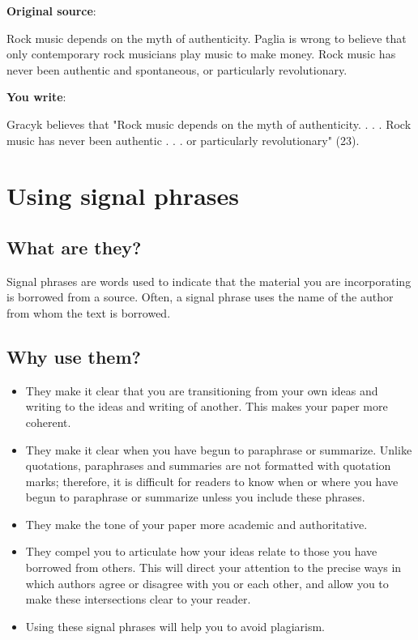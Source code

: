 \textbf{Original source}:

Rock music depends on the myth of authenticity. Paglia is wrong to believe that only contemporary rock musicians play music to make money. Rock music has never been authentic and spontaneous, or particularly revolutionary.

\textbf{You write}:

Gracyk believes that "Rock music depends on the myth of authenticity. . . . Rock music has never been authentic . . . or particularly revolutionary" (23).


 

\section{Using signal phrases}
 
 
\subsection{What are they?}
 
Signal phrases are words used to indicate that the material you are incorporating 
is borrowed from a source. Often, a signal phrase uses the name of the author from 
whom the text is borrowed.
 
\subsection {Why use them?}
 \begin{itemize}

\item They make it clear that you are transitioning from your own ideas and 
writing to the ideas and writing of another. This makes your paper more coherent.
 
\item They make it clear when you have begun to paraphrase or summarize.
Unlike quotations, paraphrases and summaries are not formatted with quotation 
marks; therefore, it is difficult for readers to know when or where you have 
begun to paraphrase or summarize unless you include these phrases.
 
\item They make the tone of your paper more academic and authoritative. 
 
\item They compel you to articulate how your ideas relate to those you 
have borrowed from others. This will direct your attention to the precise 
ways in which authors agree or disagree with you or each other, and allow 
you to make these intersections clear to your reader.
 
\item Using these signal phrases will help you to avoid plagiarism.
 \end{itemize}
 
